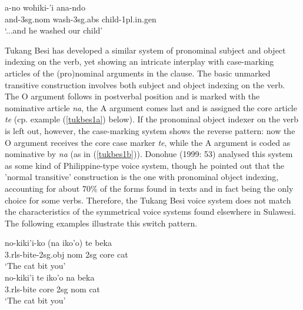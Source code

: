 \ea \label{tolaki1}
\gll a-no wohiki-'i ana-ndo \\
and-\acs{3}\acs{sg}.\acs{nom} wash-\acs{3}\acs{sg}.\acs{abs} child-\acs{1}\acs{pl}.\acs{in}.\acs{gen} \\
\glft `...and he washed our child'  \\ 
\z
\xe

Tukang Besi has developed a similar system of pronominal subject and object indexing on the verb, yet showing an intricate interplay with case-marking articles of the (pro)nominal arguments in the clause. The basic unmarked transitive construction involves both subject and object indexing on the verb. The O argument follows in postverbal position and is marked with the nominative article \textit{na}, the A argument comes last and is assigned the core article \textit{te} (cp. example (\ref{tukbes1a}) below). If the pronominal object indexer on the verb is left out, however, the case-marking system shows the reverse pattern: now the O argument receives the core case marker \textit{te}, while the A argument is coded as nominative by \textit{na} (as in (\ref{tukbes1b})). Donohue (1999: 53) analysed this system as some kind of Philippine-type voice system, though he pointed out that the 'normal transitive' construction is the one with pronominal object indexing, accounting for about 70\% of the forms found in texts and in fact being the only choice for some verbs. Therefore, the Tukang Besi voice system does not match the characteristics of the symmetrical voice systems found elsewhere in Sulawesi. The following examples illustrate this switch pattern.

\pex 
\a \label{tukbes1a}
\gll no-kiki'i-ko (na iko'o) te beka \\
\acs{3}.\acs{rls}-bite-\acs{2}\acs{sg}.\acs{obj} \acs{nom} \acs{2}\acs{sg} \acs{core} cat \\
\glft `The cat bit you' \\ 
\z
\a \label{tukbes1b}
\gla no-kiki'i te iko'o na beka \\ 
\acs{3}.\acs{rls}-bite \acs{core} \acs{2}\acs{sg} \acs{nom} cat \\
\glft `The cat bit you' \\ 
\z
\xe

